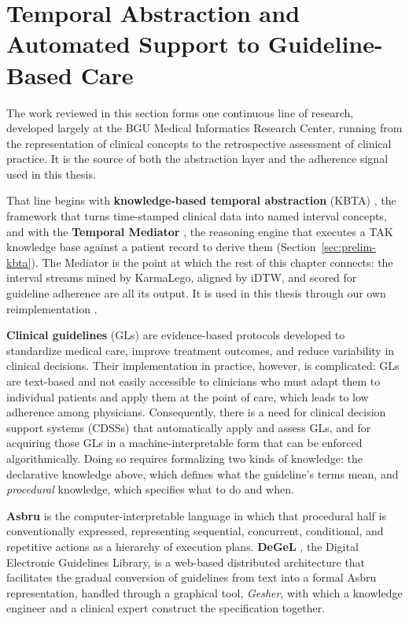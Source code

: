 \section{Temporal Abstraction and Automated Support to Guideline-Based Care}
\label{sec:rw-guidelines}

The work reviewed in this section forms one continuous line of research, developed largely at the BGU Medical Informatics Research Center, running from the representation of clinical concepts to the retrospective assessment of clinical practice. It is the source of both the abstraction layer and the adherence signal used in this thesis.

That line begins with \textbf{knowledge-based temporal abstraction} (KBTA) \citep{shahar1997framework}, the framework that turns time-stamped clinical data into named interval concepts, and with the \textbf{Temporal Mediator} \citep{shahar1997framework}, the reasoning engine that executes a TAK knowledge base against a patient record to derive them (Section~\ref{sec:prelim-kbta}). The Mediator is the point at which the rest of this chapter connects: the interval streams mined by KarmaLego, aligned by iDTW, and scored for guideline adherence are all its output. It is used in this thesis through our own reimplementation \citep{mediator-github}.

\textbf{Clinical guidelines} (GLs) are evidence-based protocols developed to standardize medical care, improve treatment outcomes, and reduce variability in clinical decisions. Their implementation in practice, however, is complicated: GLs are text-based and not easily accessible to clinicians who must adapt them to individual patients and apply them at the point of care, which leads to low adherence among physicians. Consequently, there is a need for clinical decision support systems (CDSSs) that automatically apply and assess GLs, and for acquiring those GLs in a machine-interpretable form that can be enforced algorithmically. Doing so requires formalizing two kinds of knowledge: the declarative knowledge above, which defines what the guideline's terms mean, and \emph{procedural} knowledge, which specifies what to do and when.

\textbf{Asbru} \citep{asbru-task-specific-intention-based-time-oriented-language, asgaard-project-task-specific-framework-application-critiquing-time-oriented-clinical-guidelines} is the computer-interpretable language in which that procedural half is conventionally expressed, representing sequential, concurrent, conditional, and repetitive actions as a hierarchy of execution plans. \textbf{DeGeL} \citep{supporting-episodic-application-clinical-guidelines}, the Digital Electronic Guidelines Library, is a web-based distributed architecture that facilitates the gradual conversion of guidelines from text into a formal Asbru representation, handled through a graphical tool, \emph{Gesher}, with which a knowledge engineer and a clinical expert construct the specification together.


